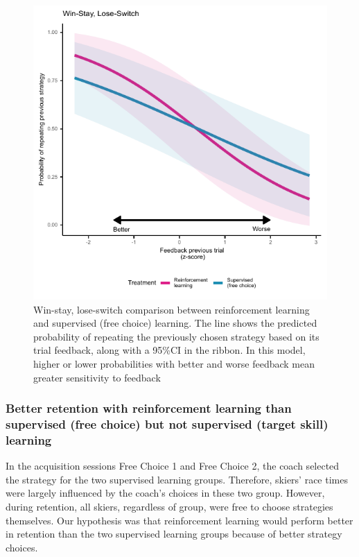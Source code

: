\begin{figure}[H]
\centering
\includegraphics{figures/figure_winstaylooseshift.pdf}
\caption{Win-stay, lose-switch comparison between reinforcement learning and supervised (free choice) learning. The line shows the predicted probability of repeating the previously chosen strategy based on its trial feedback, along with a 95\%CI in the ribbon. In this model, higher or lower probabilities with better and worse feedback mean greater sensitivity to feedback}\label{fig: choice_wsls}
\end{figure}


\subsubsection{Better retention with reinforcement learning than supervised (free choice) but not supervised (target skill) learning} \label{result_racetime_retention}
In the acquisition sessions Free Choice 1 and Free Choice 2, the coach selected the strategy for the two supervised learning groups. Therefore, skiers' race times were largely influenced by the coach's choices in these two group. However, during retention, all skiers, regardless of group, were free to choose strategies themselves. Our hypothesis was that reinforcement learning would perform better in retention than the two supervised learning groups because of better strategy choices.

